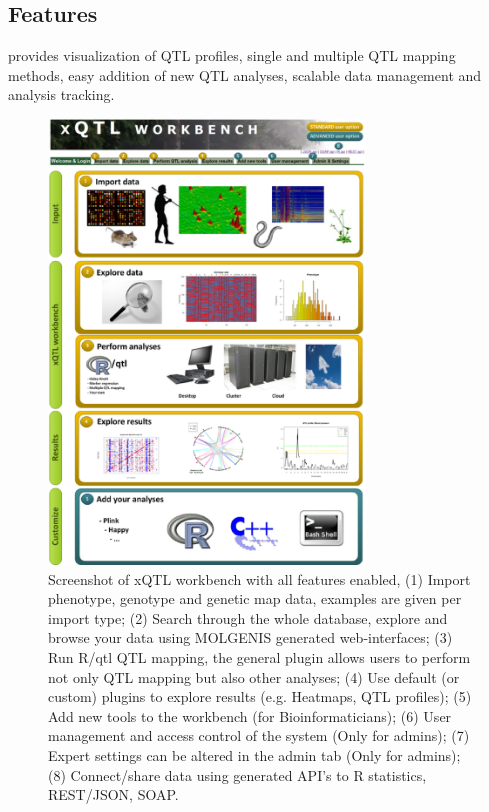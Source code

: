 \subsection{Features}
\xqtlwb provides visualization of QTL profiles, single and multiple QTL mapping methods, easy addition 
of new QTL analyses, scalable data management and analysis tracking.

\begin{figure}[h!]
  \centering
  \includegraphics[width=0.75\textwidth]{eps/image_5_4.eps}
  \caption[xQTL workbench.]{Screenshot of xQTL workbench with all features enabled, (1) Import phenotype, genotype 
          and genetic map data, examples are given per import type; (2) Search through the whole database, explore 
          and browse your data using MOLGENIS generated web-interfaces; (3) Run R/qtl QTL mapping, the general 
          plugin allows users to perform not only QTL mapping but also other analyses; (4) Use default (or custom) 
          plugins to explore results (e.g. Heatmaps, QTL profiles); (5) Add new tools to the workbench (for 
          Bioinformaticians); (6) User management and access control of the system (Only for admins); (7) Expert 
          settings can be altered in the admin tab (Only for admins); (8) Connect/share data using generated API's 
          to R statistics, REST/JSON, SOAP.}
          \label{fig:xQTLworkbench}
\end{figure}

